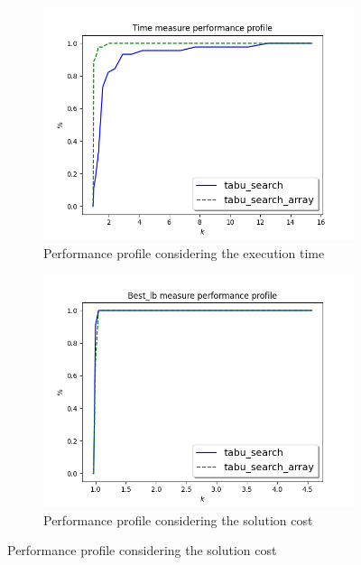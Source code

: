 \begin{figure}[!h]
	\centering
	\begin{subfigure}{0.49\columnwidth}
		\centering
		\includegraphics[width=\columnwidth]{../res/Ltabu_LA_time.png}
		\caption{Performance profile considering the execution time}
		\label{fig:tabu_search_diff_perform_time}
	\end{subfigure}
\hfill
	\begin{subfigure}{0.49\columnwidth}
		\centering
		\includegraphics[width=\columnwidth]{../res/Ltabu_LA_lb.png}
		\caption{Performance profile considering the solution cost}
		\label{fig:tabu_search_diff_perform_lb}
	\end{subfigure}
\end{figure}


